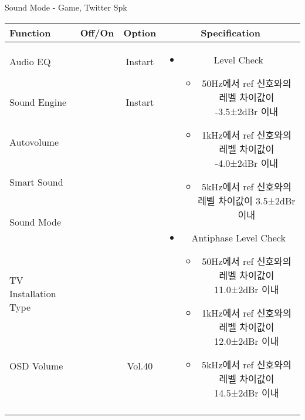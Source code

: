 \begin{frame}[t]{Sound Mode - Game, Twitter Spk}
\begin{tiny}
\begin{tabular}{@{}lccc@{}}
\toprule
Function & Off/On & Option & Specification \\
\midrule
Audio EQ & \color{black}{Off} & Instart &
\multirow{10}{60mm}{
\begin{itemize}
\item Level Check
  \begin{itemize}
  \item 50Hz에서 ref 신호와의 레벨 차이값이 -3.5±2dBr 이내
  \item 1kHz에서 ref 신호와의 레벨 차이값이 -4.0±2dBr 이내
  \item 5kHz에서 ref 신호와의 레벨 차이값이 3.5±2dBr 이내
  \end{itemize}
\item Antiphase Level Check
  \begin{itemize}
  \item 50Hz에서 ref 신호와의 레벨 차이값이 11.0±2dBr 이내
  \item 1kHz에서 ref 신호와의 레벨 차이값이 12.0±2dBr 이내
  \item 5kHz에서 ref 신호와의 레벨 차이값이 14.5±2dBr 이내
  \end{itemize}
\end{itemize}
} \\
Sound Engine & \color{blue}{On} & Instart & \\
Autovolume & \color{black}{Off} & & \\
Smart Sound & \color{black}{Off} & & \\
Sound Mode & \color{blue}{On} & \color{blue}{Game} & \\
TV Installation Type & \color{blue}{On} & \color{black}{Standtype1} & \\
OSD Volume & \color{blue}{On} & Vol.40 & \\
& & & \\
& & & \\
& & & \\
& & & \\
\midrule
\end{tabular}
\end{tiny}

\end{frame}